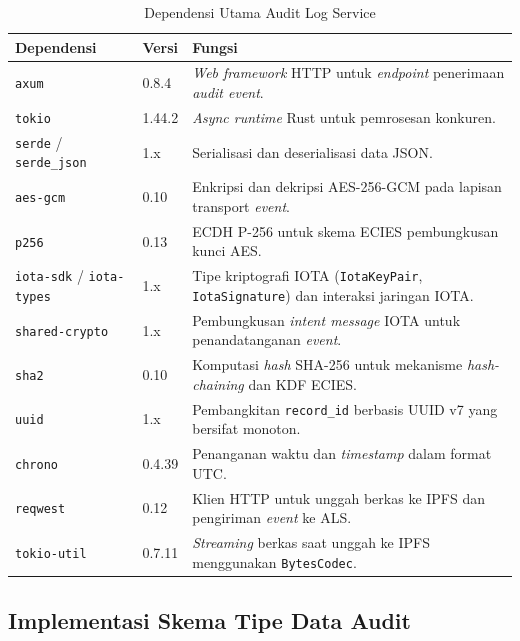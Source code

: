 \begin{table}[htbp]
\centering
\caption{Dependensi Utama Audit Log Service}
\label{tab:dependensi-als}
\renewcommand{\arraystretch}{1.3}
\begin{tabular}{|p{3.5cm}|p{2cm}|p{6.5cm}|}
\hline
\textbf{Dependensi} & \textbf{Versi} & \textbf{Fungsi} \\
\hline
\texttt{axum} & 0.8.4 & \textit{Web framework} HTTP untuk \textit{endpoint} penerimaan \textit{audit event}. \\
\hline
\texttt{tokio} & 1.44.2 & \textit{Async runtime} Rust untuk pemrosesan konkuren. \\
\hline
\texttt{serde} / \texttt{serde\_json} & 1.x & Serialisasi dan deserialisasi data JSON. \\
\hline
\texttt{aes-gcm} & 0.10 & Enkripsi dan dekripsi AES-256-GCM pada lapisan transport \textit{event}. \\
\hline
\texttt{p256} & 0.13 & ECDH P-256 untuk skema ECIES pembungkusan kunci AES. \\
\hline
\texttt{iota-sdk} / \texttt{iota-types} & 1.x & Tipe kriptografi IOTA (\texttt{IotaKeyPair}, \texttt{IotaSignature}) dan interaksi jaringan IOTA. \\
\hline
\texttt{shared-crypto} & 1.x & Pembungkusan \textit{intent message} IOTA untuk penandatanganan \textit{event}. \\
\hline
\texttt{sha2} & 0.10 & Komputasi \textit{hash} SHA-256 untuk mekanisme \textit{hash-chaining} dan KDF ECIES. \\
\hline
\texttt{uuid} & 1.x & Pembangkitan \texttt{record\_id} berbasis UUID v7 yang bersifat monoton. \\
\hline
\texttt{chrono} & 0.4.39 & Penanganan waktu dan \textit{timestamp} dalam format UTC. \\
\hline
\texttt{reqwest} & 0.12 & Klien HTTP untuk unggah berkas ke IPFS dan pengiriman \textit{event} ke ALS. \\
\hline
\texttt{tokio-util} & 0.7.11 & \textit{Streaming} berkas saat unggah ke IPFS menggunakan \texttt{BytesCodec}. \\
\hline
\end{tabular}
\end{table}

\subsection{Implementasi Skema Tipe Data Audit}
\label{subsec:impl-skema-tipe-data}

